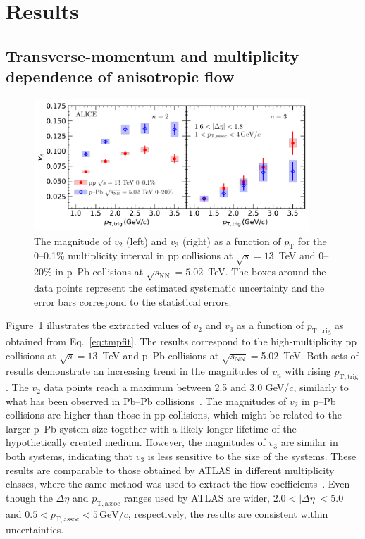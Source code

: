 
\section {Results}
\label{sec:results}
\subsection{Transverse-momentum and multiplicity dependence of anisotropic flow}

\begin{figure}[!b]
	\centering
	\hspace{-4.5em}\includegraphics[width=0.92\textwidth]{figures/FIG4_vn_pppPb.pdf} %
	\caption{The magnitude of $v_2$ (left) and $v_3$ (right) as a function of $p_\mathrm{T}$ for the 0--0.1\% multiplicity interval in pp collisions at $\sqrt{s}=13$~TeV and 0--20\% in p--Pb collisions at $\sqrt{s_\mathrm{NN}} = 5.02$~TeV. The boxes around the data points represent the estimated systematic uncertainty and the error bars correspond to the statistical errors.}
	\label{fig:vn}
\end{figure}
Figure~\ref{fig:vn} illustrates the extracted values of $v_2$ and $v_3$ as a function of $p_{\mathrm{T,trig}}$ as obtained from Eq.~\eqref{eq:tmpfit}. The results correspond to the high-multiplicity pp collisions at $\sqrt{s}=13$~TeV and p--Pb collisions at $\sqrt{s_\mathrm{NN}}=$5.02~TeV. Both sets of results demonstrate an increasing trend in the magnitudes of $v_n$ with rising $p_{\mathrm{T,trig}}$. The $v_2$ data points reach a maximum between 2.5 and 3.0 GeV/$c$, similarly to what has been observed in Pb--Pb collisions~\cite{Abelev:2012di, ALICE:2018yph}.
The magnitudes of $v_2$ in p--Pb collisions are higher than those in pp collisions, which might be related to the larger p--Pb system size together with a likely longer lifetime of the hypothetically created medium.
However, the magnitudes of $v_3$ are similar in both systems, indicating that $v_3$ is less sensitive to the size of the systems.
These results are comparable to those obtained by ATLAS in different multiplicity classes, where the same method was used to extract the flow coefficients~\cite{ATLAS:2016yzd}. Even though the $\Delta\eta$ and $p_{\mathrm{T,assoc}}$ ranges used by ATLAS are wider, $2.0<|\Delta\eta|<5.0$ and $0.5<p_{\mathrm{T,assoc}}<5\,\mathrm{GeV}/c$, respectively, the results are consistent within uncertainties.


